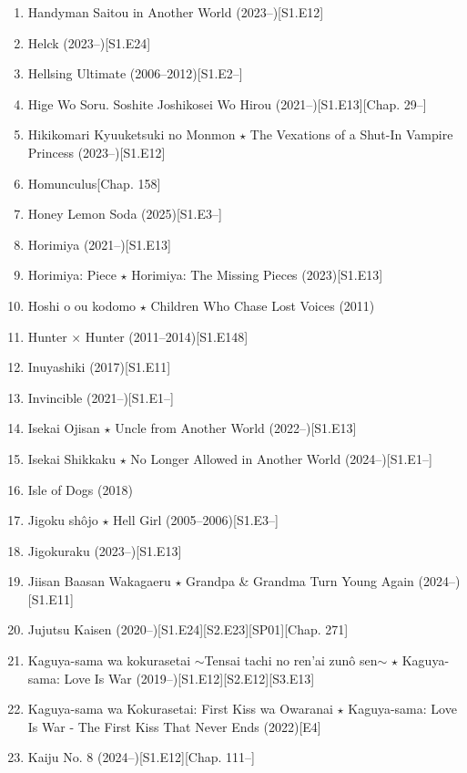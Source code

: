 \documentclass{article}
\begin{document}
\begin{enumerate}
    \item {\sc Handyman Saitou in Another World} (2023--)\hfill[S1.E12]
    \item {\sc Helck} (2023--)\hfill[S1.E24]
    \item Hellsing Ultimate (2006--2012)\hfill[S1.E2--]
    \item {\sc Hige Wo Soru. Soshite Joshikosei Wo Hirou} (2021--)\hfill[S1.E13][Chap. 29--]
    \item {\sc Hikikomari Kyuuketsuki no Monmon $\star$ The Vexations of a Shut-In Vampire Princess} (2023--)\hfill[S1.E12]
    \item {\sc Homunculus}\hfill[Chap. 158]
    \item Honey Lemon Soda (2025)\hfill[S1.E3--]
    \item {\sc Horimiya} (2021--)\hfill[S1.E13]
    \item {\sc Horimiya: Piece $\star$ Horimiya: The Missing Pieces} (2023)\hfill[S1.E13]
    \item {\sc Hoshi o ou kodomo $\star$ Children Who Chase Lost Voices} (2011)
    \item {\sc Hunter $\times$ Hunter} (2011--2014)\hfill[S1.E148]
    \item {\sc Inuyashiki} (2017)\hfill[S1.E11]
    \item Invincible (2021--)\hfill[S1.E1--]
    \item Isekai Ojisan $\star$ Uncle from Another World (2022--)\hfill[S1.E13]
    \item Isekai Shikkaku $\star$ No Longer Allowed in Another World (2024--)\hfill[S1.E1--]
    \item {\sc Isle of Dogs} (2018)
    \item Jigoku shôjo $\star$ Hell Girl (2005--2006)\hfill[S1.E3--]
    \item Jigokuraku (2023--)\hfill[S1.E13]
    \item {\sc Jiisan Baasan Wakagaeru $\star$ Grandpa \& Grandma Turn Young Again} (2024--)\hfill[S1.E11]
    \item {\sc Jujutsu Kaisen} (2020--)\hfill[S1.E24][S2.E23][SP01][Chap. 271]
    \item Kaguya-sama wa kokurasetai $\sim$Tensai tachi no ren'ai zun\^o sen$\sim$ $\star$ Kaguya-sama: Love Is War (2019--)\hfill[S1.E12][S2.E12][S3.E13]
    \item {\sc Kaguya-sama wa Kokurasetai: First Kiss wa Owaranai $\star$ Kaguya-sama: Love Is War - The First Kiss That Never Ends} (2022)\hfill[E4]
    \item Kaiju No. 8 (2024--)\hfill[S1.E12][Chap. 111--]

\end{enumerate}
\end{document}
